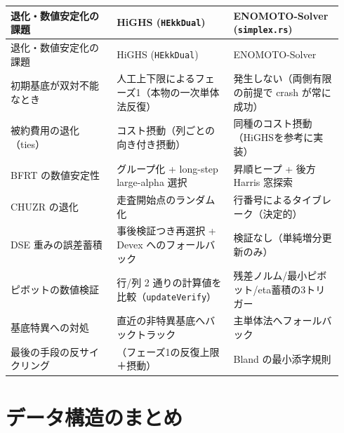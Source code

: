 \documentclass[11pt,a4paper]{ltjsarticle}
\newcommand{\code}[1]{\texttt{#1}}
\begin{document}
\begin{longtable}{@{}p{0.30\linewidth}p{0.33\linewidth}p{0.31\linewidth}@{}}
\toprule
退化・数値安定化の課題 & HiGHS (\code{HEkkDual}) & ENOMOTO-Solver (\code{simplex.rs}) \\
\midrule
\endfirsthead
\toprule
退化・数値安定化の課題 & HiGHS (\code{HEkkDual}) & ENOMOTO-Solver \\
\midrule
\endhead
初期基底が双対不能なとき & 人工上下限によるフェーズ1（本物の一次単体法反復） & 発生しない（両側有限の前提で crash が常に成功） \\
被約費用の退化（ties） & コスト摂動（列ごとの向き付き摂動） & 同種のコスト摂動（HiGHSを参考に実装） \\
BFRT の数値安定性 & グループ化 + long-step large-alpha 選択 & 昇順ヒープ + 後方 Harris 窓探索 \\
CHUZR の退化 & 走査開始点のランダム化 & 行番号によるタイブレーク（決定的） \\
DSE 重みの誤差蓄積 & 事後検証つき再選択 + Devex へのフォールバック & 検証なし（単純増分更新のみ） \\
ピボットの数値検証 & 行/列 2 通りの計算値を比較（\code{updateVerify}） & 残差ノルム/最小ピボット/eta蓄積の3トリガー \\
基底特異への対処 & 直近の非特異基底へバックトラック & 主単体法へフォールバック \\
最後の手段の反サイクリング & （フェーズ1の反復上限＋摂動） & Bland の最小添字規則 \\
\bottomrule
\end{longtable}

\section{データ構造のまとめ}
\end{document}
